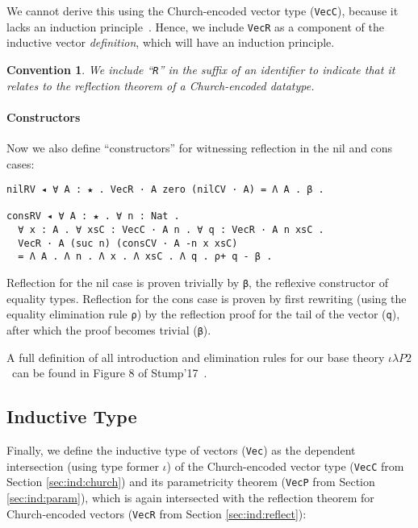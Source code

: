 \documentclass[a4paper,envcountsame,envcountsect]{llncs}
\newtheorem{convention}{Convention}
\newcommand{\refsec}[1]{Section \ref{sec:#1}}
\newcommand{\labsec}[1]{\label{sec:#1}}
\newcommand{\cdle}[0]{\ensuremath{\iota \lambda P2}~}
\begin{document}
We cannot derive this using the Church-encoded vector type
(\texttt{VecC}), because it lacks an
induction principle~\cite{geuvers01}. Hence, we
include \texttt{VecR} as a component
of the inductive vector \textit{definition},
which will have an induction principle.

\begin{convention}
We include ``\texttt{R}'' in
the suffix of an identifier to indicate that it relates to
the reflection theorem of a Church-encoded datatype.
\end{convention}

\paragraph{Constructors}

Now we also define ``constructors'' for witnessing reflection in the
nil and cons cases:

\begin{verbatim}
nilRV ◂ ∀ A : ★ . VecR · A zero (nilCV · A) = Λ A . β .

consRV ◂ ∀ A : ★ . ∀ n : Nat .
  ∀ x : A . ∀ xsC : VecC · A n . ∀ q : VecR · A n xsC .
  VecR · A (suc n) (consCV · A -n x xsC)
  = Λ A . Λ n . Λ x . Λ xsC . Λ q . ρ+ q - β .
\end{verbatim}

Reflection for the nil case is proven trivially by \texttt{β}, the
reflexive constructor of equality types. Reflection for the cons case
is proven by first rewriting (using the equality elimination rule
\texttt{ρ}) by the reflection proof for the tail of the vector (\texttt{q}),
after which the proof becomes trivial (\texttt{β}).

\begin{remark}
A full definition of all introduction and elimination rules for our
base theory \cdle can be found in Figure 8 of Stump'17~\cite{stump17b}.
\end{remark}

\subsection{Inductive Type}
\labsec{ind:ind}

Finally, we define the inductive type of vectors (\texttt{Vec}) as the
dependent intersection (using type former $\iota$) of the
Church-encoded vector type
(\texttt{VecC} from \refsec{ind:church}) and its
parametricity theorem
(\texttt{VecP} from \refsec{ind:param}), which is again
intersected with the reflection theorem for
Church-encoded vectors (\texttt{VecR} from \refsec{ind:reflect}):
\end{document}
